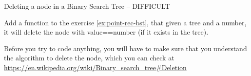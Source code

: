  {Deleting a node in a Binary Search Tree -- DIFFICULT}
\label{ex:point-rec-delete-node-bst}

Add a function to the exercise \ref{ex:point-rec-bst}, that given a tree and a
number, it will delete the node with value==number (if it exists in the tree).

Before you try to code anything, you will have to make sure that you understand
the algorithm to delete the node, which you can check at
\url{https://en.wikipedia.org/wiki/Binary_search_tree#Deletion}


